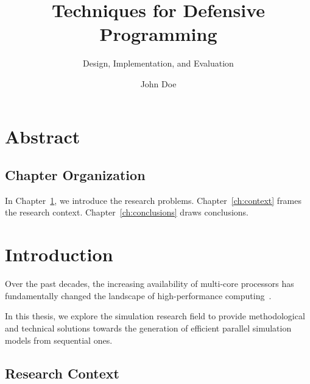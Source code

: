 \documentclass[phd,english,lof,lot]{tvthesis}
\title{Techniques for Defensive Programming}
\subtitle{Design, Implementation, and Evaluation}
\author{John Doe}
\begin{document}
\maketitle

\frontmatter

\dedication{To my family,\\who supported me throughout this journey}

\tableofcontents


\begin{abstract}
\lipsum[1]
\end{abstract}


\begin{acknowledgments}
\lipsum[2]
\end{acknowledgments}



\mainmatter


\chapter*{Abstract}
\label{abstract}

\lipsum[3][3-4]

\section*{Chapter Organization}

In Chapter~\ref{ch:introduction}, we introduce the research problems.
Chapter~\ref{ch:context} frames the research context.
Chapter~\ref{ch:conclusions} draws conclusions.



\chapter{Introduction}
\label{ch:introduction}

Over the past decades, the increasing availability of multi-core processors
has fundamentally changed the landscape of high-performance
computing~\cite{sutter2005}. 

In this thesis, we explore the simulation research field to provide
methodological and technical solutions towards the generation of efficient
parallel simulation models from sequential ones.


\section{Research Context}
\end{document}
